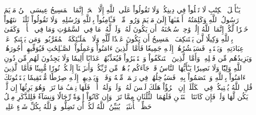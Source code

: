 يَـٰٓأَهۡلَ ٱلۡكِتَٰبِ لَا تَغۡلُواْ فِي دِينِكُمۡ وَلَا تَقُولُواْ عَلَى ٱللَّهِ إِلَّا ٱلۡحَقَّۚ إِنَّمَا ٱلۡمَسِيحُ عِيسَى ٱبۡنُ مَرۡيَمَ رَسُولُ ٱللَّهِ وَكَلِمَتُهُۥٓ أَلۡقَىٰهَآ إِلَىٰ مَرۡيَمَ وَرُوحٞ مِّنۡهُۖ فَـَٔامِنُواْ بِٱللَّهِ وَرُسُلِهِۦۖ وَلَا تَقُولُواْ ثَلَٰثَةٌۚ ٱنتَهُواْ خَيۡرٗا لَّكُمۡۚ إِنَّمَا ٱللَّهُ إِلَٰهٞ وَٰحِدٞۖ سُبۡحَٰنَهُۥٓ أَن يَكُونَ لَهُۥ وَلَدٞۘ لَّهُۥ مَا فِي ٱلسَّمَٰوَٰتِ وَمَا فِي ٱلۡأَرۡضِۗ وَكَفَىٰ بِٱللَّهِ وَكِيلٗا
لَّن يَسۡتَنكِفَ ٱلۡمَسِيحُ أَن يَكُونَ عَبۡدٗا لِّلَّهِ وَلَا ٱلۡمَلَـٰٓئِكَةُ ٱلۡمُقَرَّبُونَۚ وَمَن يَسۡتَنكِفۡ عَنۡ عِبَادَتِهِۦ وَيَسۡتَكۡبِرۡ فَسَيَحۡشُرُهُمۡ إِلَيۡهِ جَمِيعٗا
فَأَمَّا ٱلَّذِينَ ءَامَنُواْ وَعَمِلُواْ ٱلصَّـٰلِحَٰتِ فَيُوَفِّيهِمۡ أُجُورَهُمۡ وَيَزِيدُهُم مِّن فَضۡلِهِۦۖ وَأَمَّا ٱلَّذِينَ ٱسۡتَنكَفُواْ وَٱسۡتَكۡبَرُواْ فَيُعَذِّبُهُمۡ عَذَابًا أَلِيمٗا وَلَا يَجِدُونَ لَهُم مِّن دُونِ ٱللَّهِ وَلِيّٗا وَلَا نَصِيرٗا
يَـٰٓأَيُّهَا ٱلنَّاسُ قَدۡ جَآءَكُم بُرۡهَٰنٞ مِّن رَّبِّكُمۡ وَأَنزَلۡنَآ إِلَيۡكُمۡ نُورٗا مُّبِينٗا
فَأَمَّا ٱلَّذِينَ ءَامَنُواْ بِٱللَّهِ وَٱعۡتَصَمُواْ بِهِۦ فَسَيُدۡخِلُهُمۡ فِي رَحۡمَةٖ مِّنۡهُ وَفَضۡلٖ وَيَهۡدِيهِمۡ إِلَيۡهِ صِرَٰطٗا مُّسۡتَقِيمٗا
يَسۡتَفۡتُونَكَ قُلِ ٱللَّهُ يُفۡتِيكُمۡ فِي ٱلۡكَلَٰلَةِۚ إِنِ ٱمۡرُؤٌاْ هَلَكَ لَيۡسَ لَهُۥ وَلَدٞ وَلَهُۥٓ أُخۡتٞ فَلَهَا نِصۡفُ مَا تَرَكَۚ وَهُوَ يَرِثُهَآ إِن لَّمۡ يَكُن لَّهَا وَلَدٞۚ فَإِن كَانَتَا ٱثۡنَتَيۡنِ فَلَهُمَا ٱلثُّلُثَانِ مِمَّا تَرَكَۚ وَإِن كَانُوٓاْ إِخۡوَةٗ رِّجَالٗا وَنِسَآءٗ فَلِلذَّكَرِ مِثۡلُ حَظِّ ٱلۡأُنثَيَيۡنِۗ يُبَيِّنُ ٱللَّهُ لَكُمۡ أَن تَضِلُّواْۗ وَٱللَّهُ بِكُلِّ شَيۡءٍ عَلِيمُۢ